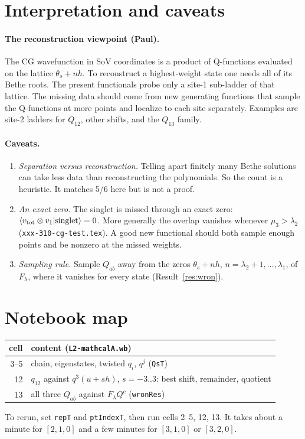 \documentclass[11pt]{article}
\newcommand{\nb}[1]{\texttt{#1}}
\theoremstyle{definition}
\theoremstyle{remark}
\begin{document}
\section{Interpretation and caveats}

\paragraph{The reconstruction viewpoint (Paul).} The CG wavefunction in SoV coordinates is a product of Q-functions evaluated on the lattice $\theta_s+nh$. To reconstruct a highest-weight state one needs all of its Bethe roots. The present functionals probe only a site-1 sub-ladder of that lattice. The missing data should come from new generating functions that sample the Q-functions at more points and localize to each site separately. Examples are site-2 ladders for $Q_{12}$, other shifts, and the $Q_{13}$ family.

\paragraph{Caveats.}
\begin{enumerate}
\item \emph{Separation versus reconstruction.} Telling apart finitely many Bethe solutions can take less data than reconstructing the polynomials. So the count is a heuristic. It matches 5/6 here but is not a proof.
\item \emph{An exact zero.} The singlet is missed through an exact zero: $\langle v_{\rm tot}\otimes v_1|\text{singlet}\rangle=0$. More generally the overlap vanishes whenever $\mu_3>\lambda_2$ (\nb{xxx-310-cg-test.tex}). A good new functional should both sample enough points and be nonzero at the missed weights.
\item \emph{Sampling rule.} Sample $Q_{ab}$ away from the zeros $\theta_s+nh$, $n=\lambda_2+1,\dots,\lambda_1$, of $F_\lambda$, where it vanishes for every state (Result~\ref{res:wron}).
\end{enumerate}

\section*{Notebook map}
\begin{center}
\begin{tabular}{rl}\toprule
cell & content (\nb{L2-mathcalA.wb})\\\midrule
3--5 & chain, eigenstates, twisted $q_i$, $q^j$ (\nb{QsT})\\
12 & $q_{12}$ against $q^3(u+sh)$, $s=-3..3$: best shift, remainder, quotient\\
13 & all three $Q_{ab}$ against $F_\lambda Q^c$ (\nb{wronRes})\\\bottomrule
\end{tabular}
\end{center}
To rerun, set \nb{repT} and \nb{ptIndexT}, then run cells 2--5, 12, 13. It takes about a minute for $[2,1,0]$ and a few minutes for $[3,1,0]$ or $[3,2,0]$.
\end{document}
